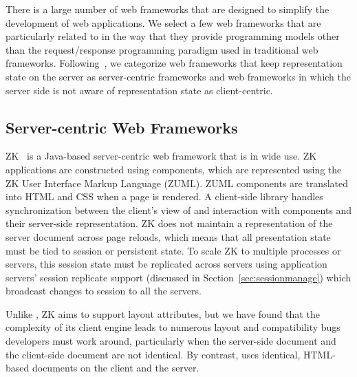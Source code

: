 
There is a large number of web frameworks that are designed to simplify
the development of web applications.  We select a few web frameworks that
are particularly related to \cb in the way that they provide programming
models other than the request/response programming paradigm used in
traditional web frameworks.  Following~\cite{ChenCheng:book2007}, we
categorize web frameworks that keep representation state on the server
as server-centric frameworks and web frameworks in which the server side
is not aware of representation state as client-centric.

%
%
\subsection{Server-centric Web Frameworks}


ZK~\cite{ChenCheng:book2007} is a Java-based server-centric web framework that
is in wide use. ZK applications are constructed using components, which are
represented using the ZK User Interface Markup Language (ZUML).  ZUML
components are translated into HTML and CSS when a page is rendered. A client-side 
library handles synchronization between the client's  view of and
interaction with components and their server-side  representation.  ZK does
not maintain a representation of the server document across page reloads,
which means that all presentation state must be tied to session or persistent
state. To scale ZK to multiple processes or servers, this session state must
be replicated across servers using application servers' session replicate
support  (discussed in Section~\ref{sec:sessionmanage}) which broadcast
changes to session to all the servers.

Unlike \projectname{}, ZK aims to support layout attributes, but
we have found that the complexity of its client engine leads to 
numerous layout and compatibility bugs developers must work around,
particularly when the server-side document and the client-side
document are not identical.  By contrast, \cb uses identical, HTML-based
documents on the client and the server.


